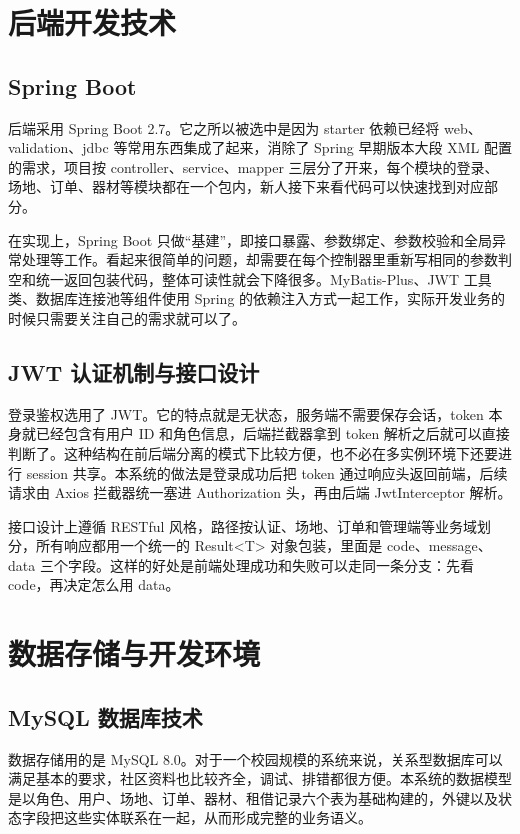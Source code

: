 \section{后端开发技术}

\subsection{Spring Boot}

后端采用 Spring Boot 2.7。它之所以被选中是因为 starter 依赖已经将 web、validation、jdbc 等常用东西集成了起来，消除了 Spring 早期版本大段 XML 配置的需求，项目按 controller、service、mapper 三层分了开来，每个模块的登录、场地、订单、器材等模块都在一个包内，新人接下来看代码可以快速找到对应部分\cite{luo2019}。

在实现上，Spring Boot 只做“基建”，即接口暴露、参数绑定、参数校验和全局异常处理等工作。看起来很简单的问题，却需要在每个控制器里重新写相同的参数判空和统一返回包装代码，整体可读性就会下降很多。MyBatis-Plus、JWT 工具类、数据库连接池等组件使用 Spring 的依赖注入方式一起工作，实际开发业务的时候只需要关注自己的需求就可以了。

\subsection{JWT 认证机制与接口设计}

登录鉴权选用了 JWT。它的特点就是无状态，服务端不需要保存会话，token 本身就已经包含有用户 ID 和角色信息，后端拦截器拿到 token 解析之后就可以直接判断了。这种结构在前后端分离的模式下比较方便，也不必在多实例环境下还要进行 session 共享\cite{wu2018}。本系统的做法是登录成功后把 token 通过响应头返回前端，后续请求由 Axios 拦截器统一塞进 Authorization 头，再由后端 JwtInterceptor 解析。

接口设计上遵循 RESTful 风格，路径按认证、场地、订单和管理端等业务域划分，所有响应都用一个统一的 Result<T> 对象包装，里面是 code、message、data 三个字段。这样的好处是前端处理成功和失败可以走同一条分支：先看 code，再决定怎么用 data。

\section{数据存储与开发环境}

\subsection{MySQL 数据库技术}

数据存储用的是 MySQL 8.0。对于一个校园规模的系统来说，关系型数据库可以满足基本的要求，社区资料也比较齐全，调试、排错都很方便。本系统的数据模型是以角色、用户、场地、订单、器材、租借记录六个表为基础构建的，外键以及状态字段把这些实体联系在一起，从而形成完整的业务语义\cite{zhang2017}。

